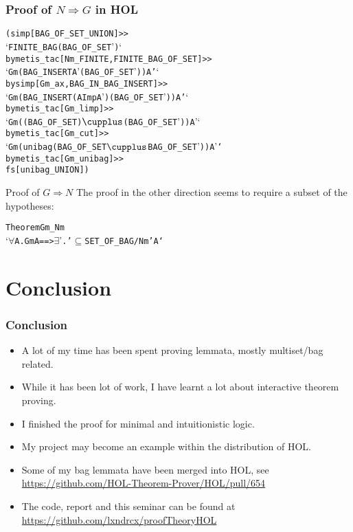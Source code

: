 \documentclass[english,svgnames,hide notes,12pt]{beamer}
\theoremstyle{definition}
\theoremstyle{remark}
\begin{document}
\begin{frame}[fragile]
    \frametitle{Proof of $N\Rightarrow G$ in HOL}
    \small
\begin{alltt}
(simp[BAG_OF_SET_UNION] >>
`FINITE_BAG (BAG_OF_SET \textGamma')`
  by metis_tac[Nm_FINITE,FINITE_BAG_OF_SET] >>
`Gm (BAG_INSERT A' (BAG_OF_SET \textGamma')) A'`
  by simp[Gm_ax,BAG_IN_BAG_INSERT] >>
`Gm (BAG_INSERT (A Imp A') (BAG_OF_SET \textGamma')) A'`
  by metis_tac[Gm_limp] >>
`Gm ((BAG_OF_SET \textGamma) \(\cupplus\) (BAG_OF_SET \textGamma')) A'`
  by metis_tac[Gm_cut] >>
`Gm (unibag (BAG_OF_SET \textGamma \(\cupplus\) BAG_OF_SET \textGamma')) A'`
  by metis_tac[Gm_unibag] >>
fs[unibag_UNION])
\end{alltt}
\end{frame}

\begin{frame}[fragile]{Proof of $G\Rightarrow N$}
    The proof in the other direction seems to require a subset of the hypotheses:
    \begin{alltt}
Theorem Gm_Nm
`\(\forall\) \textGamma A. Gm \textGamma A ==> \(\exists\) \textGamma'. \textGamma' \(\subseteq\) SET_OF_BAG \textGamma /\bs{} Nm \textGamma' A`
    \end{alltt}
\end{frame}

\section{Conclusion}

\begin{frame}
    \frametitle{Conclusion}
    \begin{itemize}
        \item A lot of my time has been spent proving lemmata, mostly multiset/bag related.
        \item While it has been lot of work, I have learnt a lot about interactive theorem proving.
        \item I finished the proof for minimal and intuitionistic logic.
        \item My project may become an example within the distribution of HOL.
        \item Some of my bag lemmata have been merged into HOL, see \url{https://github.com/HOL-Theorem-Prover/HOL/pull/654}
        \item The code, report and this seminar can be found at \url{https://github.com/lxndrcx/proofTheoryHOL}
    \end{itemize}
\end{frame}
\end{document}

